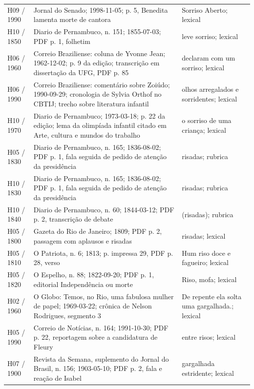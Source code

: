 \begin{longtable}{>{\raggedright\arraybackslash}p{}>{\raggedright\arraybackslash}p{}>{\raggedright\arraybackslash}p{}}
H09 / 1990 & Jornal do Senado; 1998-11-05; p. 5, Benedita lamenta morte de cantora & Sorriso Aberto; lexical \cite{acervoD090} \\
H10 / 1850 & Diario de Pernambuco, n. 151; 1855-07-03; PDF p. 1, folhetim & leve sorriso; lexical \cite{acervoD091} \\
H06 / 1960 & Correio Braziliense: coluna de Yvonne Jean; 1962-12-02; p. 9 da edição; transcrição em dissertação da UFG, PDF p. 85 & declaram com um sorriso; lexical \cite{acervoD092} \\
H06 / 1990 & Correio Braziliense: comentário sobre Zoiúdo; 1990-09-29; cronologia de Sylvia Orthof no CBTIJ; trecho sobre literatura infantil & olhos arregalados e sorridentes; lexical \cite{acervoD093} \\
H10 / 1970 & Diario de Pernambuco; 1973-03-18; p. 22 da edição; lema da olimpíada infantil citado em Arte, cultura e mundos do trabalho & o sorriso de uma criança; lexical \cite{acervoD094} \\
H05 / 1830 & Diario de Pernambuco, n. 165; 1836-08-02; PDF p. 1, fala seguida de pedido de atenção da presidência & risadas; rubrica \cite{acervoD095} \\
H10 / 1830 & Diario de Pernambuco, n. 165; 1836-08-02; PDF p. 1, fala seguida de pedido de atenção da presidência & risadas; rubrica \cite{acervoD095} \\
H10 / 1840 & Diario de Pernambuco, n. 60; 1844-03-12; PDF p. 2, transcrição de debate & (risadas); rubrica \cite{acervoD097} \\
H05 / 1800 & Gazeta do Rio de Janeiro; 1809; PDF p. 2, passagem com aplausos e risadas & risadas; lexical \cite{acervoD098} \\
H05 / 1810 & O Patriota, n. 6; 1813; p. impressa 29, PDF p. 28, verso & Hum riso doce e fagueiro; lexical \cite{acervoD099} \\
H05 / 1820 & O Espelho, n. 88; 1822-09-20; PDF p. 1, editorial Independência ou morte & Riso, mofa; lexical \cite{acervoD100} \\
H02 / 1960 & O Globo: Temos, no Rio, uma fabulosa mulher de papel; 1969-03-22; crônica de Nelson Rodrigues, segmento 3 & De repente ela solta uma gargalhada.; lexical \cite{acervoD101} \\
H05 / 1990 & Correio de Notícias, n. 164; 1991-10-30; PDF p. 22, reportagem sobre a candidatura de Fleury & entre risos; lexical \cite{acervoD102} \\
H07 / 1900 & Revista da Semana, suplemento do Jornal do Brasil, n. 156; 1903-05-10; PDF p. 2, fala e reação de Isabel & gargalhada estridente; lexical \cite{acervoD103} \\

\end{longtable}
